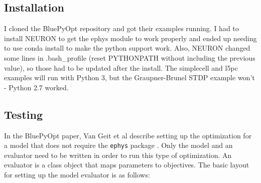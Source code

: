 \documentclass[11pt]{article}
\begin{document}
		\subsection{Installation} %
			\label{sub:installation}
			
			I cloned the BluePyOpt repository and got their examples running. I had to install NEURON to get the ephys module to work properly and ended up needing to use conda install to make the python support work. Also, NEURON changed some lines in .bash\_profile (reset PYTHONPATH without including the previous value), so those had to be updated after the install. The simplecell and l5pc examples will run with Python 3, but the Graupner-Brunel STDP example won't - Python 2.7 worked.

		\subsection{Testing} %
			\label{sub:testing}
			In the BluePyOpt paper, Van Geit et al describe setting up the optimization for a model that does not require the \verb|ephys| package \cite{Van-Geit:2016aa}. Only the model and an evaluator need to be written in order to run this type of optimization. An evaluator is a class object that maps parameters to objectives. The basic layout for setting up the model evaluator is as follows:
\end{document}
